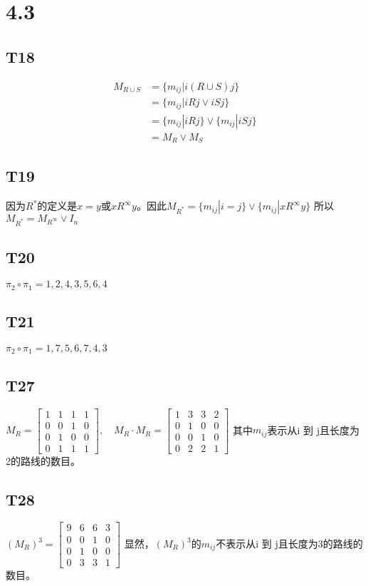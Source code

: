 \documentclass{article}
\begin{document}
\section{4.3}
\subsection{T18}
\begin{align*}
    M_{R \cup S} &= \{m_{ij} | i (R \cup S) j\}\\
    &= \{m_{ij} | iRj \lor iSj\}\\
    &= \{m_{ij} | iRj\} \lor \{m_{ij} | iSj\}\\
    &= M_R \lor M_S
\end{align*}
\subsection{T19}
因为$R^*$的定义是$x = y$或$x R^{\infty} y$。因此$M_{R^*} = \{m_{ij} | i = j\} \lor \{m_{ij} | x R^{\infty} y\}$
所以$M_{R^*} = M_{R^{\infty}} \lor I_n$
\subsection{T20}
$\pi_2 \circ \pi_1 = 1, 2, 4, 3, 5, 6, 4$
\subsection{T21}
$\pi_2 \circ \pi_1 = 1, 7, 5, 6, 7, 4, 3$
\subsection{T27}
$M_R = 
\begin{bmatrix}
    1 & 1 & 1 & 1\\
    0 & 0 & 1 & 0\\
    0 & 1 & 0 & 0\\
    0 & 1 & 1 & 1
\end{bmatrix}
,\quad M_R \cdot M_R = 
\begin{bmatrix}
    1 & 3 & 3 & 2\\
    0 & 1 & 0 & 0\\
    0 & 0 & 1 & 0\\
    0 & 2 & 2 & 1
\end{bmatrix}$
其中$m_{ij}$表示从i 到 j且长度为2的路线的数目。
\subsection{T28}
$(M_R)^3 = 
\begin{bmatrix}
    9 & 6 & 6 & 3\\
    0 & 0 & 1 & 0\\
    0 & 1 & 0 & 0\\
    0 & 3 & 3 & 1
\end{bmatrix}$
显然，$(M_R)^3$的$m_{ij}$不表示从i 到 j且长度为3的路线的数目。
\end{document}
